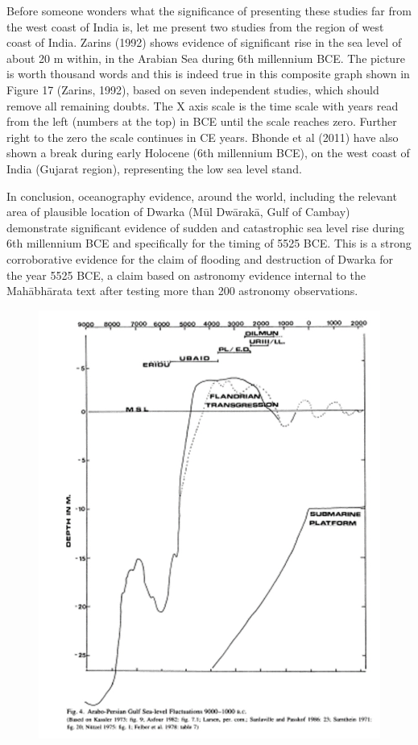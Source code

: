 Before someone wonders what the significance of presenting these studies far from the west coast of India is, let me present two studies from the region of west coast of India. Zarins (1992) shows evidence of significant rise in the sea level of about 20 m within, in the Arabian Sea during 6th millennium BCE. The picture is worth thousand words and this is indeed true in this composite graph shown in Figure 17 (Zarins, 1992), based on seven independent studies, which should remove all remaining doubts. The X axis scale is the time scale with years read from the left (numbers at the top) in BCE until the scale reaches zero. Further right to the zero the scale continues in CE years. Bhonde et al (2011) have also shown a break during early Holocene (6th millennium BCE), on the west coast of India (Gujarat region), representing the low sea level stand.

\newpage

In conclusion, oceanography evidence, around the world, including the relevant area of plausible location of Dwarka (Mūl Dwārakā, Gulf of Cambay) demonstrate significant evidence of sudden and catastrophic sea level rise during 6th millennium BCE and specifically for the timing of 5525 BCE. This is a strong corroborative evidence for the claim of flooding and destruction of Dwarka for the year 5525 BCE, a claim based on astronomy evidence internal to the Mahābhārata text after testing more than 200 astronomy observations.

\begin{figure}[!htbp]
\includegraphics[scale=0.3]{"images/8-17.jpg"}
\caption{}\label{art8-fig17}
\end{figure}


